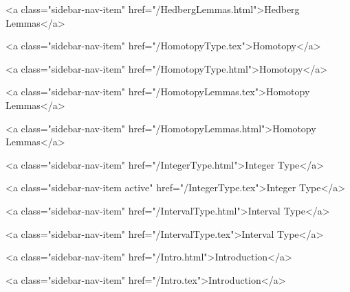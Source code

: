       
    
      
        
          <a class="sidebar-nav-item" href="/HedbergLemmas.html">Hedberg Lemmas</a>
        
      
    
      
        
          <a class="sidebar-nav-item" href="/HomotopyType.tex">Homotopy</a>
        
      
    
      
        
          <a class="sidebar-nav-item" href="/HomotopyType.html">Homotopy</a>
        
      
    
      
        
          <a class="sidebar-nav-item" href="/HomotopyLemmas.tex">Homotopy Lemmas</a>
        
      
    
      
        
          <a class="sidebar-nav-item" href="/HomotopyLemmas.html">Homotopy Lemmas</a>
        
      
    
      
        
          <a class="sidebar-nav-item" href="/IntegerType.html">Integer Type</a>
        
      
    
      
        
          <a class="sidebar-nav-item active" href="/IntegerType.tex">Integer Type</a>
        
      
    
      
        
          <a class="sidebar-nav-item" href="/IntervalType.html">Interval Type</a>
        
      
    
      
        
          <a class="sidebar-nav-item" href="/IntervalType.tex">Interval Type</a>
        
      
    
      
        
          <a class="sidebar-nav-item" href="/Intro.html">Introduction</a>
        
      
    
      
        
          <a class="sidebar-nav-item" href="/Intro.tex">Introduction</a>
        
